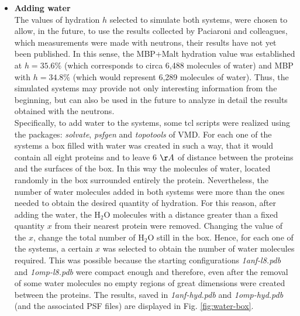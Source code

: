 \begin{itemize}
\item \textbf{Adding water}\\
The values of hydration $h$ selected to simulate both systems, were chosen to allow, in the future, to use the results collected by Paciaroni and colleagues, which measurements were made with neutrons, their results have not yet been published. In this sense, the MBP+Malt hydration value was established at $h = 35.6\%$  (which corresponds to circa 6,488 molecules of water) and MBP with $h = 34.8\%$ (which would represent 6,289 molecules of water).
Thus, the simulated systems may provide not only interesting information from the beginning, but can also be used in the future to analyze in detail the results obtained with the neutrons.\\
Specifically, to add water to the systems, some tcl scripts were realized using the packages: \textit{solvate}, \textit{psfgen} and \textit{topotools} of VMD. For each one of the systems a box filled with water was created in such a way, that it would contain all eight proteins and to leave 6 $\AA$ of distance between the proteins and the surfaces of the box. In this way the molecules of water, located randomly in the box surrounded entirely the protein. Nevertheless, the number of water molecules added in both systems were more than the ones needed to obtain the desired quantity of hydration. For this reason, after adding the water, the H$_2$O molecules with a distance greater than a fixed quantity $x$ from their nearest protein were removed. Changing the value of the $x$, change the total number of H$_2$O still in the box. Hence, for each one of the systems, a certain $x$ was selected to obtain the number of water molecules required. This was possible because the starting configurations \textit{1anf-l8.pdb} and \textit{1omp-l8.pdb} were compact enough and therefore, even after the removal of some water molecules no empty regions of great dimensions were created between the proteins. The results, saved in \textit{1anf-hyd.pdb} and \textit{1omp-hyd.pdb} (and the associated PSF files) are displayed in Fig. \ref{fig:water-box}.

\end{itemize}

